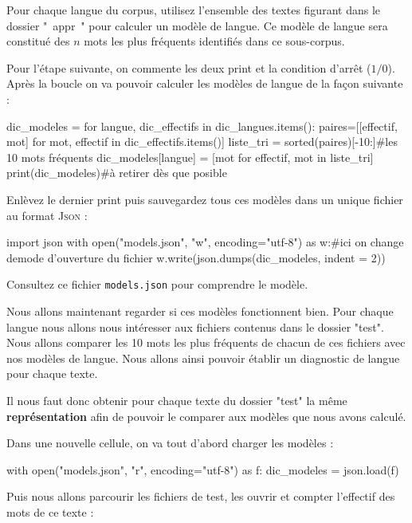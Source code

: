  Pour chaque langue du corpus, utilisez l'ensemble des textes figurant dans le dossier " appr " pour calculer un modèle de langue. Ce modèle de langue sera constitué des $n$ mots les plus fréquents identifiés dans ce sous-corpus.

Pour l'étape suivante, on commente les deux print et la condition d'arrêt ($1/0$). Après la boucle on va pouvoir calculer les modèles de langue de la façon suivante :
\begin{python}
dic_modeles = {}
for langue, dic_effectifs in dic_langues.items():
  paires=[[effectif, mot] for mot, effectif in  dic_effectifs.items()]
  liste_tri = sorted(paires)[-10:]#les 10 mots fréquents
  dic_modeles[langue] = [mot for effectif, mot in liste_tri]
print(dic_modeles)#à retirer dès que posible
\end{python}


 Enlèvez le dernier print puis sauvegardez tous ces modèles dans un unique fichier au format \textsc{Json} :

\begin{python}
import json
with open("models.json", "w", encoding="utf-8") as w:#ici on change demode d'ouverture du fichier
  w.write(json.dumps(dic_modeles, indent = 2))
\end{python}

Consultez ce fichier \texttt{models.json} pour comprendre le modèle.

\vspace{0.5cm}
\vspace{0.5cm}

 Nous allons maintenant regarder si ces modèles fonctionnent bien.
 Pour chaque langue nous allons nous intéresser aux fichiers contenus dans le dossier  "test".
 Nous allons comparer les 10 mots les plus fréquents de chacun de ces fichiers avec nos modèles de langue.
 Nous allons ainsi pouvoir établir un diagnostic de langue pour chaque texte.

 Il nous faut donc obtenir pour chaque texte du dossier "test" la même \textbf{représentation} afin de pouvoir le comparer aux modèles que nous avons calculé.

 Dans une nouvelle cellule, on va tout d'abord charger les modèles :

\begin{python}
with open("models.json", "r", encoding="utf-8") as f:
  dic_modeles = json.load(f)
\end{python}

Puis nous allons parcourir les fichiers de test, les ouvrir et compter l'effectif des mots de ce texte :

